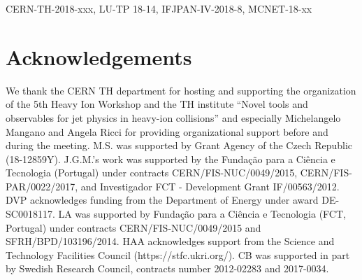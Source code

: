 \documentclass{article}
\begin{document}
\maketitle

\begin{abstract}
Studies of fully reconstructed QCD jets in heavy-ion collisions remain one of the most firmly established programs aimed at extracting properties of hot and dense nuclear matter. Most recently, substructure observables have opened new and exciting directions by introducing techniques amenable to dissecting jets and extending the plethora of established observables. This report, summarizing the main lines of discussion at the 5th Heavy Ion Jet Workshop and CERN TH institute ``Novel tools and observables for jet physics in heavy-ion collisions'' in 2017, presents a first attempt at outlining a strategy for isolating and identifying the relevant physical processes that are responsible for the observed modifications by combining theory insights with sophisticated jet reconstruction techniques, including grooming and background subtraction algorithms. 
\end{abstract}

\begin{flushright}
CERN-TH-2018-xxx, LU-TP 18-14, IFJPAN-IV-2018-8, MCNET-18-xx
\end{flushright}
%






\section*{Acknowledgements} 
We thank the CERN TH department for hosting and supporting the organization of the 5th Heavy Ion Workshop and the TH institute ``Novel tools and observables for jet physics in heavy-ion collisions'' and especially Michelangelo Mangano and Angela Ricci for providing organizational support before and during the meeting.
M.S. was supported by Grant Agency of the Czech Republic (18-12859Y).
J.G.M.'s work was supported  by the Funda{\c c}{\~ a}o para a Ci{\^ e}ncia e Tecnologia (Portugal) under contracts CERN/FIS-NUC/0049/2015, CERN/FIS-PAR/0022/2017, and Investigador FCT - Development Grant IF/00563/2012.
DVP acknowledges funding from the Department of Energy under award DE-SC0018117.
LA was supported by Funda{\c c}{\~ a}o para a Ci{\^ e}ncia e Tecnologia (FCT, Portugal) under contracts CERN/FIS-NUC/0049/2015 and SFRH/BPD/103196/2014.
HAA acknowledges support from the Science and Technology Facilities Council (https://stfc.ukri.org/).
CB was supported in part by Swedish Research Council, contracts number 2012-02283 and 2017-0034.

\appendix




\end{document}

